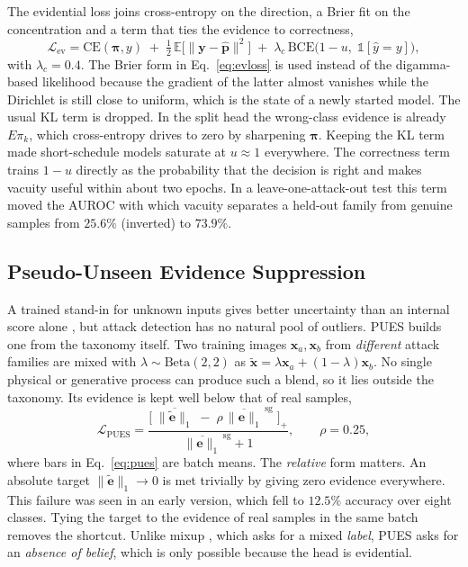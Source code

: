 \documentclass[conference]{IEEEtran}
\newcommand{\bs}[1]{\boldsymbol{#1}}
\newcommand{\sub}[1]{\subsection{\texorpdfstring{\textbf{#1}}{#1}}}
\begin{document}
The evidential loss joins cross-entropy on the direction, a Brier fit on the
concentration \cite{sensoy2018edl} and a term that ties the evidence to correctness,
\begin{equation}
\mathcal{L}_{\text{ev}} = \mathrm{CE}(\bs{\pi},y)
\;+\; \tfrac{1}{2}\,\mathbb{E}\bigl[\lVert \bs{y}-\hat{\bs{p}}\rVert^{2}\bigr]
\;+\; \lambda_{c}\,\mathrm{BCE}\bigl(1-u,\;\mathbb{1}[\hat{y}=y]\bigr),
\label{eq:evloss}
\end{equation}
with $\lambda_{c}=0.4$. The Brier form in Eq.~\eqref{eq:evloss} is used instead of the
digamma-based likelihood because the gradient of the latter almost vanishes while the
Dirichlet is still close to uniform, which is the state of a newly started model.
The usual KL term is dropped. In the split head the wrong-class evidence is already
$E\pi_{k}$, which cross-entropy drives to zero by sharpening $\bs{\pi}$. Keeping the
KL term made short-schedule models saturate at $u\approx1$ everywhere. The
correctness term trains $1-u$ directly as the probability that the decision is right
and makes vacuity useful within about two epochs. In a leave-one-attack-out test this
term moved the AUROC with which vacuity separates a held-out family from genuine
samples from $25.6\%$ (inverted) to $73.9\%$.

\sub{Pseudo-Unseen Evidence Suppression}
A trained stand-in for unknown inputs gives better uncertainty than an internal score
alone \cite{hendrycks2019oe}, but attack detection has no natural pool of outliers.
PUES builds one from the taxonomy itself. Two training images $\bs{x}_{a},\bs{x}_{b}$
from \emph{different} attack families are mixed with $\lambda\sim\mathrm{Beta}(2,2)$
as $\tilde{\bs{x}}=\lambda\bs{x}_{a}+(1-\lambda)\bs{x}_{b}$. No single physical or
generative process can produce such a blend, so it lies outside the taxonomy. Its
evidence is kept well below that of real samples,
\begin{equation}
\mathcal{L}_{\text{PUES}} =
\frac{\bigl[\;\overline{\lVert\tilde{\bs{e}}\rVert_{1}}
      \;-\;\rho\,\overline{\lVert\bs{e}\rVert_{1}}^{\,\text{sg}}\;\bigr]_{+}}
     {\overline{\lVert\bs{e}\rVert_{1}}^{\,\text{sg}}+1},
\qquad \rho = 0.25,
\label{eq:pues}
\end{equation}
where bars in Eq.~\eqref{eq:pues} are batch means. The \emph{relative} form matters.
An absolute target $\lVert\tilde{\bs{e}}\rVert_{1}\to0$ is met trivially by giving
zero evidence everywhere. This failure was seen in an early version, which fell to
$12.5\%$ accuracy over eight classes. Tying the target to the evidence of real samples
in the same batch removes the shortcut. Unlike mixup \cite{zhang2018mixup}, which
asks for a mixed \emph{label}, PUES asks for an \emph{absence of belief}, which is only
possible because the head is evidential.
\end{document}
